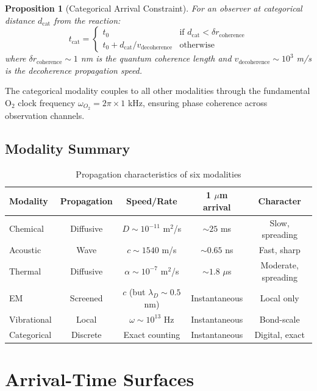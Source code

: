 \documentclass[11pt,a4paper]{article}
\newtheorem{proposition}[theorem]{Proposition}
\theoremstyle{remark}
\newcommand{\dcat}{d_{\mathrm{cat}}}
\newcommand{\rxntime}{t_0}
\begin{document}
\begin{proposition}[Categorical Arrival Constraint]
\label{prop:cat_arrival}
For an observer at categorical distance $\dcat$ from the reaction:
\begin{equation}
    t_{\text{cat}} = \begin{cases}
        \rxntime & \text{if } \dcat < \delta r_{\text{coherence}} \\
        \rxntime + \dcat / v_{\text{decoherence}} & \text{otherwise}
    \end{cases}
\end{equation}
where $\delta r_{\text{coherence}} \sim 1$ nm is the quantum coherence length and $v_{\text{decoherence}} \sim 10^3$ m/s is the decoherence propagation speed.
\end{proposition}

The categorical modality couples to all other modalities through the fundamental O$_2$ clock frequency $\omega_{O_2} = 2\pi \times 1$ kHz, ensuring phase coherence across observation channels.

\subsection{Modality Summary}

\begin{table}[H]
\centering
\caption{Propagation characteristics of six modalities}
\label{tab:modalities}
\begin{tabular}{lcccc}
\toprule
Modality & Propagation & Speed/Rate & 1 $\mu$m arrival & Character \\
\midrule
Chemical & Diffusive & $D \sim 10^{-11}$ m$^2$/s & $\sim 25$ ms & Slow, spreading \\
Acoustic & Wave & $c \sim 1540$ m/s & $\sim 0.65$ ns & Fast, sharp \\
Thermal & Diffusive & $\alpha \sim 10^{-7}$ m$^2$/s & $\sim 1.8$ $\mu$s & Moderate, spreading \\
EM & Screened & $c$ (but $\lambda_D \sim 0.5$ nm) & Instantaneous & Local only \\
Vibrational & Local & $\omega \sim 10^{13}$ Hz & Instantaneous & Bond-scale \\
Categorical & Discrete & Exact counting & Instantaneous & Digital, exact \\
\bottomrule
\end{tabular}
\end{table}

\section{Arrival-Time Surfaces}
\label{sec:arrival}
\end{document}
